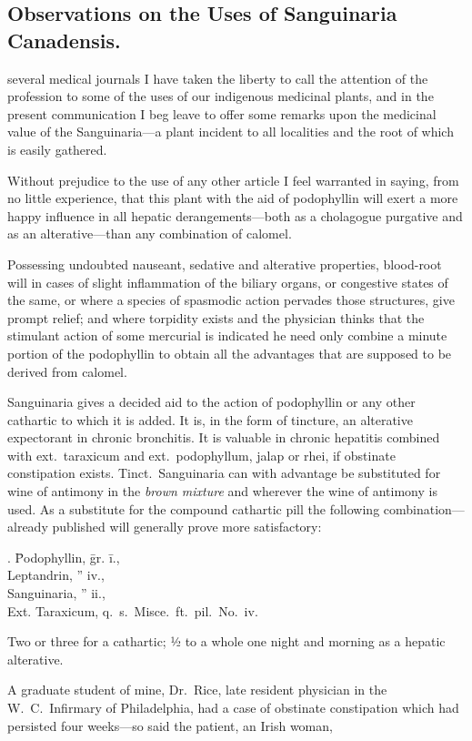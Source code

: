 \subsection*{Observations on the Uses of Sanguinaria
Canadensis.}


 several medical journals I have taken the liberty to call the attention
of the profession to some of the uses of our indigenous medicinal
plants, and in the present communication I beg leave to offer some
remarks upon the medicinal value of the Sanguinaria---a plant incident
to all localities and the root of which is easily gathered.

Without prejudice to the use of any other article I feel warranted in
saying, from no little experience, that this plant with the aid of podophyllin
will exert a more happy influence in all hepatic derangements---both
as a cholagogue purgative and as an alterative---than any combination
of calomel.

Possessing undoubted nauseant, sedative and alterative properties,
blood-root will in cases of slight inflammation of the biliary organs, or
congestive states of the same, or where a species of spasmodic action
pervades those structures, give prompt relief; and where torpidity
exists and the physician thinks that the stimulant action of some mercurial
is indicated he need only combine a minute portion of the
podophyllin to obtain all the advantages that are supposed to be
derived from calomel.

Sanguinaria gives a decided aid to the action of podophyllin or any
other cathartic to which it is added.   It is, in the form of tincture, an
alterative expectorant in chronic bronchitis.   It is valuable in chronic
hepatitis combined with ext.\ taraxicum and ext.\ podophyllum, jalap or
rhei, if obstinate constipation exists.    Tinct.\ Sanguinaria can with
advantage be substituted for wine of antimony in the \emph{brown mixture}
and wherever the wine of antimony is used.   As a substitute for the
compound cathartic pill the following combination---already published
will generally prove more satisfactory:

\begin{center}
\begin{tabbing}
  \prescription. \= Podophyllin, \= gr. \= i., \\
    \> Leptandrin, \> ''\> iv., \\
    \> Sanguinaria, \> ''\> ii., \\
    \> Ext. Taraxicum, q.\ s.\ Misce.\ ft.\ pil.\ No.\ iv. \\
\end{tabbing}
\end{center}
Two or three for a cathartic; ½ to a whole one night and morning as a
hepatic alterative.

A graduate student of mine, Dr.~Rice, late resident physician in the
W.~C.\ Infirmary of Philadelphia, had a case of obstinate constipation
which had persisted four weeks---so said the patient, an Irish woman,\endinput
